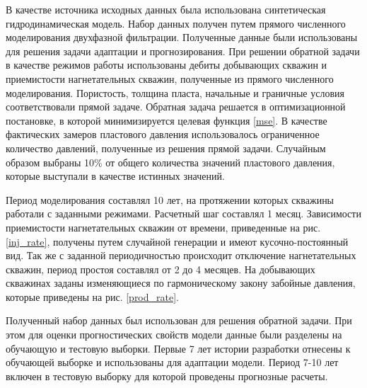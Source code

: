 \documentclass{article}
\begin{document}
В качестве источника исходных данных была использована синтетическая гидродинамическая модель. Набор данных получен путем прямого численного моделирования двухфазной фильтрации. Полученные данные были использованы для решения задачи адаптации и прогнозирования.
При решении обратной задачи в качестве режимов работы использованы дебиты добывающих скважин и приемистости нагнетательных скважин, полученные из прямого численного моделирования. Пористость, толщина пласта, начальные и граничные условия соответствовали прямой задаче. Обратная задача решается в оптимизационной постановке, в которой минимизируется целевая функция {\ref{mse}}. В качестве фактических замеров пластового давления использовалось ограниченное количество давлений, полученные из решения прямой задачи. Случайным образом выбраны 10\% от общего количества значений пластового давления, которые выступали в качестве истинных значений.

Период моделирования составлял 10 лет, на протяжении которых скважины работали с заданными режимами. Расчетный шаг составлял 1 месяц. Зависимости приемистости нагнетательных скважин от времени, приведенные на рис. \ref{inj_rate}, получены путем случайной генерации и имеют кусочно-постоянный вид. Так же с заданной периодичностью происходит отключение нагнетательных скважин, период простоя составлял от 2 до 4 месяцев. На добывающих скважинах заданы изменяющиеся по гармоническому закону забойные давления, которые приведены на рис. \ref{prod_rate}.

Полученный набор данных был использован для решения обратной задачи. При этом для оценки прогностических свойств модели данные были разделены на обучающую и тестовую выборки. Первые 7 лет истории разработки отнесены к обучающей выборке и использованы для адаптации модели. Период 7-10 лет включен в тестовую выборку для которой проведены прогнозные расчеты. 
\end{document}
